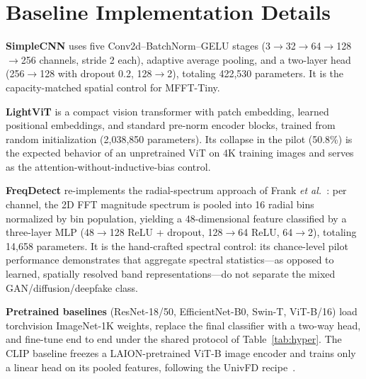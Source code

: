 \documentclass[journal]{IEEEtran}
\begin{document}
\appendices

\section{Baseline Implementation Details}
\label{app:baselines}
\textbf{SimpleCNN} uses five Conv2d--BatchNorm--GELU stages (3$\rightarrow$32$\rightarrow$64$\rightarrow$128$\rightarrow$256 channels, stride 2 each), adaptive average pooling, and a two-layer head (256$\rightarrow$128 with dropout 0.2, 128$\rightarrow$2), totaling 422{,}530 parameters. It is the capacity-matched spatial control for MFFT-Tiny.

\textbf{LightViT} is a compact vision transformer with patch embedding, learned positional embeddings, and standard pre-norm encoder blocks, trained from random initialization (2{,}038{,}850 parameters). Its collapse in the pilot (50.8\%) is the expected behavior of an unpretrained ViT on 4K training images and serves as the attention-without-inductive-bias control.

\textbf{FreqDetect} re-implements the radial-spectrum approach of Frank \textit{et al.}~\cite{frank2020}: per channel, the 2D FFT magnitude spectrum is pooled into 16 radial bins normalized by bin population, yielding a 48-dimensional feature classified by a three-layer MLP (48$\rightarrow$128 ReLU + dropout, 128$\rightarrow$64 ReLU, 64$\rightarrow$2), totaling 14{,}658 parameters. It is the hand-crafted spectral control: its chance-level pilot performance demonstrates that aggregate spectral statistics---as opposed to learned, spatially resolved band representations---do not separate the mixed GAN/diffusion/deepfake class.

\textbf{Pretrained baselines} (ResNet-18/50, EfficientNet-B0, Swin-T, ViT-B/16) load torchvision ImageNet-1K weights, replace the final classifier with a two-way head, and fine-tune end to end under the shared protocol of Table~\ref{tab:hyper}. The CLIP baseline freezes a LAION-pretrained ViT-B image encoder and trains only a linear head on its pooled features, following the UnivFD recipe~\cite{ojha2023}.

\end{document}
